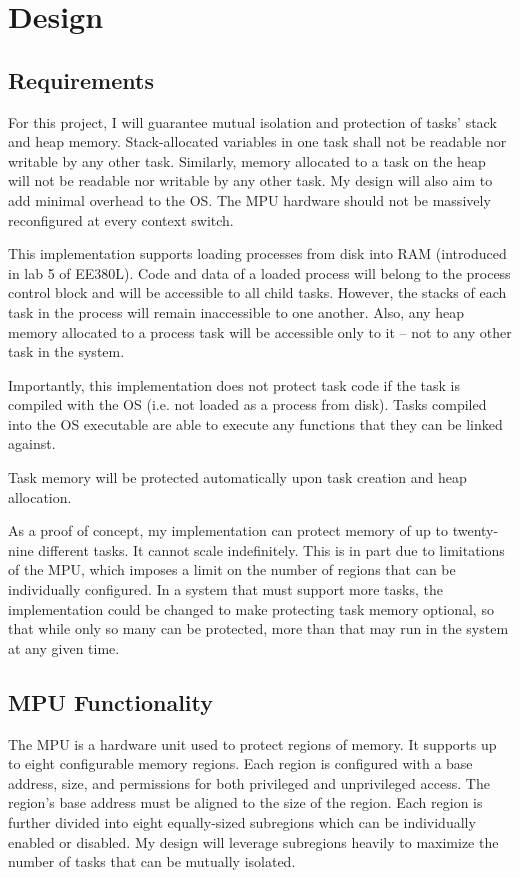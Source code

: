 \chapter{Design}

\section{Requirements}

For this project, I will guarantee mutual isolation and protection of tasks' stack and heap memory. Stack-allocated variables in one task shall not be readable nor writable by any other task. Similarly, memory allocated to a task on the heap will not be readable nor writable by any other task. My design will also aim to add minimal overhead to the OS. The MPU hardware should not be massively reconfigured at every context switch.

This implementation supports loading processes from disk into RAM (introduced in lab 5 of EE380L). Code and data of a loaded process will belong to the process control block and will be accessible to all child tasks. However, the stacks of each task in the process will remain inaccessible to one another. Also, any heap memory allocated to a process task will be accessible only to it -- not to any other task in the system.

Importantly, this implementation does not protect task code if the task is compiled with the OS (i.e. not loaded as a process from disk). Tasks compiled into the OS executable are able to execute any functions that they can be linked against.

Task memory will be protected automatically upon task creation and heap allocation.

As a proof of concept, my implementation can protect memory of up to twenty-nine different tasks. It cannot scale indefinitely. This is in part due to limitations of the MPU, which imposes a limit on the number of regions that can be individually configured. In a system that must support more tasks, the implementation could be changed to make protecting task memory optional, so that while only so many can be protected, more than that may run in the system at any given time.

\section{MPU Functionality}

The MPU is a hardware unit used to protect regions of memory. It supports up to eight configurable memory regions. Each region is configured with a base address, size, and permissions for both privileged and unprivileged access. The region's base address must be aligned to the size of the region. Each region is further divided into eight equally-sized subregions which can be individually enabled or disabled. My design will leverage subregions heavily to maximize the number of tasks that can be mutually isolated.

